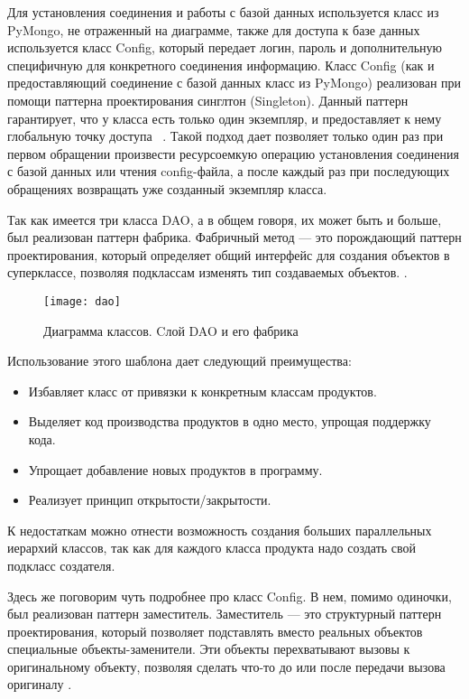 \documentclass[14pt]{extreport}
\begin{document}
Для установления соединения и работы с базой данных используется класс из PyMongo, не отраженный на диаграмме, также для доступа к базе данных используется класс Config, который передает логин, пароль и дополнительную специфичную для конкретного соединения информацию. Класс Config (как и предоставляющий соединение с базой данных класс из PyMongo) реализован при помощи паттерна проектирования синглтон (Singleton). Данный паттерн гарантирует, что у класса есть только один экземпляр, и предоставляет к нему глобальную точку доступа ~\cite{oop}. Такой подход дает позволяет только один раз при первом обращении произвести ресурсоемкую операцию установления соединения с базой данных или чтения config-файла, а после каждый раз при последующих обращениях возвращать уже созданный экземпляр класса. 

Так как имеется три класса DAO, а в общем говоря, их может быть и больше, был реализован паттерн фабрика. Фабричный метод — это порождающий паттерн проектирования, который определяет общий интерфейс для создания объектов в суперклассе, позволяя подклассам изменять тип создаваемых объектов. \cite{pattern-factory}.

\begin{figure}[H]
	\centerline{\texttt{[image: dao]}}
	\caption{Диаграмма классов. Cлой DAO и его фабрика}
	\label{fig7}
\end{figure}


Использование этого шаблона дает следующий преимущества:
\begin{itemize}
\item Избавляет класс от привязки к конкретным классам продуктов.
\item Выделяет код производства продуктов в одно место, упрощая поддержку кода.
\item Упрощает добавление новых продуктов в программу.
\item Реализует принцип открытости/закрытости.
\end{itemize}

К недостаткам можно отнести возможность создания больших параллельных иерархий классов, так как для каждого класса продукта надо создать свой подкласс создателя.

Здесь же поговорим чуть подробнее про класс Config. В нем, помимо одиночки, был реализован паттерн заместитель. 
Заместитель — это структурный паттерн проектирования, который позволяет подставлять вместо реальных объектов специальные объекты-заменители. Эти объекты перехватывают вызовы к оригинальному объекту, позволяя сделать что-то до или после передачи вызова оригиналу \cite{pattern-proxy}. 
\end{document}
